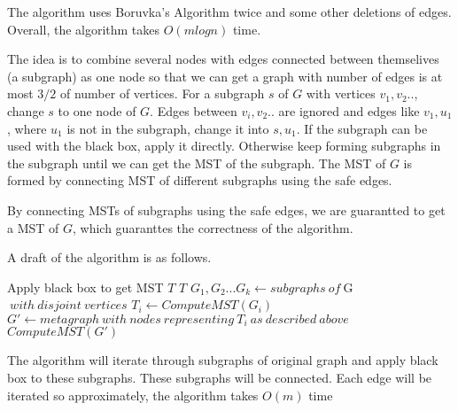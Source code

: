 \documentclass[12pt,a4paper]{article}
\newcommand{\question}[1]{\bigskip\noindent{\textbf{Q{#1} solution}}}
\begin{document}
The algorithm uses Boruvka's Algorithm twice and some other deletions of edges. Overall, the algorithm takes $O(mlogn)$ time.

\question{29.B}

The idea is to combine several nodes with edges connected between themselives (a subgraph) as one node so that we can get a graph with number of edges is at most $3/2$ of number of vertices. For a subgraph $s$ of $G$ with vertices $v_1,v_2..$, change $s$ to one node of $G$. Edges between $v_i,v_2..$ are ignored and edges like ${v_1,u_1}$, where $u_1$ is not in the subgraph, change it into ${s,u_1}$. If the subgraph can be used with the black box, apply it directly. Otherwise keep forming subgraphs in the subgraph until we can get the MST of the subgraph. The MST of $G$ is formed by connecting MST of different subgraphs using the safe edges. 

By connecting MSTs of subgraphs using the safe edges, we are guarantted to get a MST of $G$, which guaranttes the correctness of the algorithm.

A draft of the algorithm is as follows. 


\begin{algorithm}
  \begin{algorithmic}
        \State Apply black box to get MST $T$
        \State \Return $T$
      \EndIf
      \State $G_1,G_2...G_k \gets subgraphs\ of\ $G$\ with\ disjoint\ vertices$
        \State $T_i \gets ComputeMST(G_i)$
      \EndFor
      \State $G' \gets metagraph\ with\ nodes\ representing\ T_i\ as\ described\ above$
      \State \Return $ComputeMST(G')$
    \EndFunction
  \end{algorithmic}
\end{algorithm}

The algorithm will iterate through subgraphs of original graph and apply black box to these subgraphs. These subgraphs will be connected. Each edge will be iterated so approximately, the algorithm takes $O(m)$ time


\question{29.C}
\end{document}
